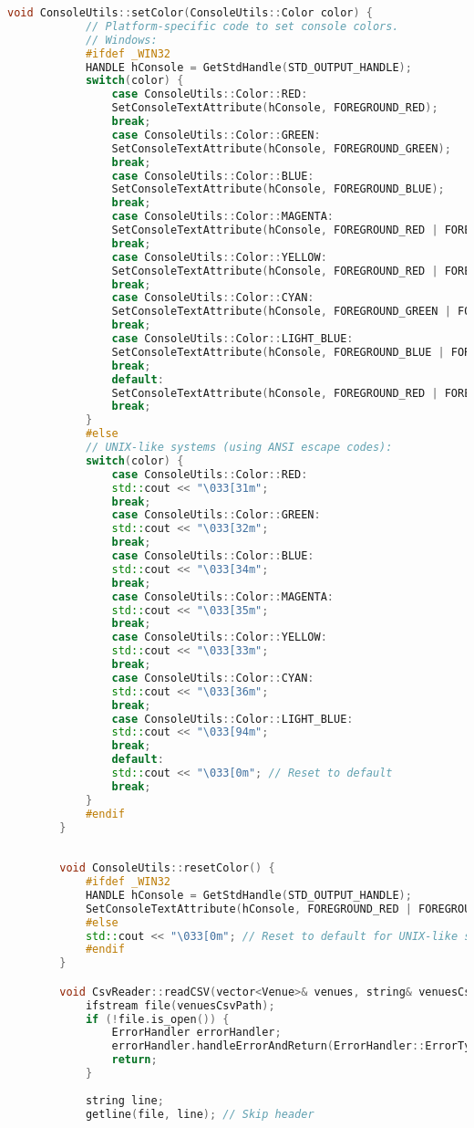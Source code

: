 \documentclass{article}
\begin{document}
\begin{mdframed}[backgroundcolor=background, hidealllines=false, innerleftmargin=15pt, innerrightmargin=5pt, innertopmargin=0pt, innerbottommargin=-5pt, linecolor=accent]
\begin{lstlisting}[language=C++]
		void ConsoleUtils::setColor(ConsoleUtils::Color color) {
			// Platform-specific code to set console colors.
			// Windows:
			#ifdef _WIN32
			HANDLE hConsole = GetStdHandle(STD_OUTPUT_HANDLE);
			switch(color) {
				case ConsoleUtils::Color::RED:
				SetConsoleTextAttribute(hConsole, FOREGROUND_RED);
				break;
				case ConsoleUtils::Color::GREEN:
				SetConsoleTextAttribute(hConsole, FOREGROUND_GREEN);
				break;
				case ConsoleUtils::Color::BLUE:
				SetConsoleTextAttribute(hConsole, FOREGROUND_BLUE);
				break;
				case ConsoleUtils::Color::MAGENTA:
				SetConsoleTextAttribute(hConsole, FOREGROUND_RED | FOREGROUND_BLUE);
				break;
				case ConsoleUtils::Color::YELLOW:
				SetConsoleTextAttribute(hConsole, FOREGROUND_RED | FOREGROUND_GREEN);
				break;
				case ConsoleUtils::Color::CYAN:
				SetConsoleTextAttribute(hConsole, FOREGROUND_GREEN | FOREGROUND_BLUE);
				break;
				case ConsoleUtils::Color::LIGHT_BLUE:
				SetConsoleTextAttribute(hConsole, FOREGROUND_BLUE | FOREGROUND_INTENSITY);
				break;
				default:
				SetConsoleTextAttribute(hConsole, FOREGROUND_RED | FOREGROUND_GREEN | FOREGROUND_BLUE); // Default to white
				break;
			}
			#else
			// UNIX-like systems (using ANSI escape codes):
			switch(color) {
				case ConsoleUtils::Color::RED:
				std::cout << "\033[31m";
				break;
				case ConsoleUtils::Color::GREEN:
				std::cout << "\033[32m";
				break;
				case ConsoleUtils::Color::BLUE:
				std::cout << "\033[34m";
				break;
				case ConsoleUtils::Color::MAGENTA:
				std::cout << "\033[35m";
				break;
				case ConsoleUtils::Color::YELLOW:
				std::cout << "\033[33m";
				break;
				case ConsoleUtils::Color::CYAN:
				std::cout << "\033[36m";
				break;
				case ConsoleUtils::Color::LIGHT_BLUE:
				std::cout << "\033[94m";
				break;
				default:
				std::cout << "\033[0m"; // Reset to default
				break;
			}
			#endif
		}
		
		
		void ConsoleUtils::resetColor() {
			#ifdef _WIN32
			HANDLE hConsole = GetStdHandle(STD_OUTPUT_HANDLE);
			SetConsoleTextAttribute(hConsole, FOREGROUND_RED | FOREGROUND_GREEN | FOREGROUND_BLUE); // Reset to white
			#else
			std::cout << "\033[0m"; // Reset to default for UNIX-like systems
			#endif
		}

		void CsvReader::readCSV(vector<Venue>& venues, string& venuesCsvPath) {
			ifstream file(venuesCsvPath);
			if (!file.is_open()) {
				ErrorHandler errorHandler;
				errorHandler.handleErrorAndReturn(ErrorHandler::ErrorType::CONFIG_OPEN_ERROR, venuesCsvPath);
				return;
			}
			
			string line;
			getline(file, line); // Skip header
			

\end{lstlisting}
\end{mdframed}
\end{document}
